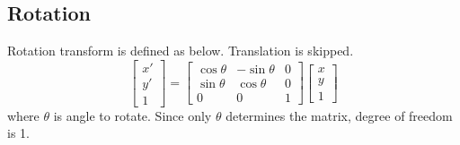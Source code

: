 \documentclass{article}
\begin{document}
\subsection{Rotation}
Rotation transform is defined as below. Translation is skipped.
$$
\begin{bmatrix}
x' \\ y' \\ 1
\end{bmatrix}
=
\begin{bmatrix}
\cos\theta & -\sin\theta & 0 \\
\sin\theta & \cos\theta & 0 \\
0 & 0 & 1
\end{bmatrix}
\begin{bmatrix}
x \\ y \\ 1
\end{bmatrix}
$$
where $\theta$ is angle to rotate. Since only $\theta$ determines the matrix, degree of freedom is 1.
\end{document}
